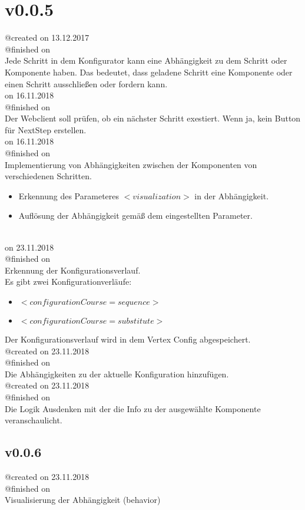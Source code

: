\documentclass{article}
\begin{document}
\section{v0.0.5}

@created on 13.12.2017\\
@finished on \\
Jede Schritt in dem Konfigurator kann eine Abhängigkeit zu dem Schritt oder
Komponente haben. Das bedeutet, dass geladene Schritt eine Komponente oder einen
Schritt ausschlie\ss{}en oder fordern kann.\\

\noindent@created on 16.11.2018\\
@finished on \\
Der Webclient soll prüfen, ob ein nächster Schritt exestiert. Wenn ja, kein Button für NextStep erstellen.\\

\noindent@created on 16.11.2018\\
@finished on \\
Implementierung von Abhängigkeiten zwischen der Komponenten von verschiedenen Schritten.
\begin{itemize}
	\item Erkennung des Parameteres $<visualization>$ in der Abhängigkeit.
	\item Auflösung der Abhängigkeit gemäß dem eingestellten Parameter.
\end{itemize}
\\

\noindent@created on 23.11.2018\\
@finished on \\
Erkennung der Konfigurationsverlauf.\\
Es gibt zwei Konfigurationverläufe: 

\begin{itemize}
	\item $<configurationCourse=sequence>$
	\item $<configurationCourse=substitute>$
\end{itemize}
\noindent Der Konfigurationsverlauf wird in dem Vertex Config abgespeichert. \\

\noindent @created on 23.11.2018\\
@finished on \\
Die Abhängigkeiten zu der aktuelle Konfiguration hinzufügen.\\

\noindent @created on 23.11.2018\\
@finished on \\
Die Logik Ausdenken mit der die Info zu der ausgewählte Komponente veranschaulicht.\\

\subsection{v0.0.6}

\noindent @created on 23.11.2018\\
@finished on \\

Visualisierung der Abhängigkeit (behavior)
\end{document}
